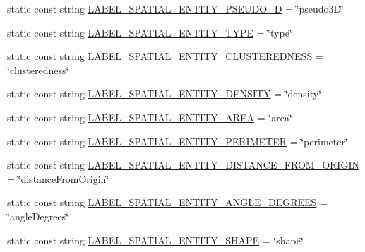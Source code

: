 \begin{DoxyCompactItemize}
\item 
static const string \hyperlink{classmultiscale_1_1analysis_1_1Detector_afc891454d41c2ede5e4b3155798045c4}{\-L\-A\-B\-E\-L\-\_\-\-S\-P\-A\-T\-I\-A\-L\-\_\-\-E\-N\-T\-I\-T\-Y\-\_\-\-P\-S\-E\-U\-D\-O\-\_\-D} = \char`\"{}pseudo3\-D\char`\"{}
\item 
static const string \hyperlink{classmultiscale_1_1analysis_1_1Detector_ac93f1fd6bdc7250b890480c7d5acf5b0}{\-L\-A\-B\-E\-L\-\_\-\-S\-P\-A\-T\-I\-A\-L\-\_\-\-E\-N\-T\-I\-T\-Y\-\_\-\-T\-Y\-P\-E} = \char`\"{}type\char`\"{}
\item 
static const string \hyperlink{classmultiscale_1_1analysis_1_1Detector_adae62b15a836592fd35057cf037730d8}{\-L\-A\-B\-E\-L\-\_\-\-S\-P\-A\-T\-I\-A\-L\-\_\-\-E\-N\-T\-I\-T\-Y\-\_\-\-C\-L\-U\-S\-T\-E\-R\-E\-D\-N\-E\-S\-S} = \char`\"{}clusteredness\char`\"{}
\item 
static const string \hyperlink{classmultiscale_1_1analysis_1_1Detector_ab4f91117dab09a9356422d839aba811f}{\-L\-A\-B\-E\-L\-\_\-\-S\-P\-A\-T\-I\-A\-L\-\_\-\-E\-N\-T\-I\-T\-Y\-\_\-\-D\-E\-N\-S\-I\-T\-Y} = \char`\"{}density\char`\"{}
\item 
static const string \hyperlink{classmultiscale_1_1analysis_1_1Detector_a163a0858c9d71d9ddac78f814d48bee6}{\-L\-A\-B\-E\-L\-\_\-\-S\-P\-A\-T\-I\-A\-L\-\_\-\-E\-N\-T\-I\-T\-Y\-\_\-\-A\-R\-E\-A} = \char`\"{}area\char`\"{}
\item 
static const string \hyperlink{classmultiscale_1_1analysis_1_1Detector_adc07a468da3a48acbb858c6a8de7dec2}{\-L\-A\-B\-E\-L\-\_\-\-S\-P\-A\-T\-I\-A\-L\-\_\-\-E\-N\-T\-I\-T\-Y\-\_\-\-P\-E\-R\-I\-M\-E\-T\-E\-R} = \char`\"{}perimeter\char`\"{}
\item 
static const string \hyperlink{classmultiscale_1_1analysis_1_1Detector_a58a41d2e2ccdbf3c760823d51ce9b0fe}{\-L\-A\-B\-E\-L\-\_\-\-S\-P\-A\-T\-I\-A\-L\-\_\-\-E\-N\-T\-I\-T\-Y\-\_\-\-D\-I\-S\-T\-A\-N\-C\-E\-\_\-\-F\-R\-O\-M\-\_\-\-O\-R\-I\-G\-I\-N} = \char`\"{}distance\-From\-Origin\char`\"{}
\item 
static const string \hyperlink{classmultiscale_1_1analysis_1_1Detector_a5cb6f0a78406631f55d4a1b11197652e}{\-L\-A\-B\-E\-L\-\_\-\-S\-P\-A\-T\-I\-A\-L\-\_\-\-E\-N\-T\-I\-T\-Y\-\_\-\-A\-N\-G\-L\-E\-\_\-\-D\-E\-G\-R\-E\-E\-S} = \char`\"{}angle\-Degrees\char`\"{}
\item 
static const string \hyperlink{classmultiscale_1_1analysis_1_1Detector_ae824ff121054358172ebf21aab8a8b46}{\-L\-A\-B\-E\-L\-\_\-\-S\-P\-A\-T\-I\-A\-L\-\_\-\-E\-N\-T\-I\-T\-Y\-\_\-\-S\-H\-A\-P\-E} = \char`\"{}shape\char`\"{}

\end{DoxyCompactItemize}
